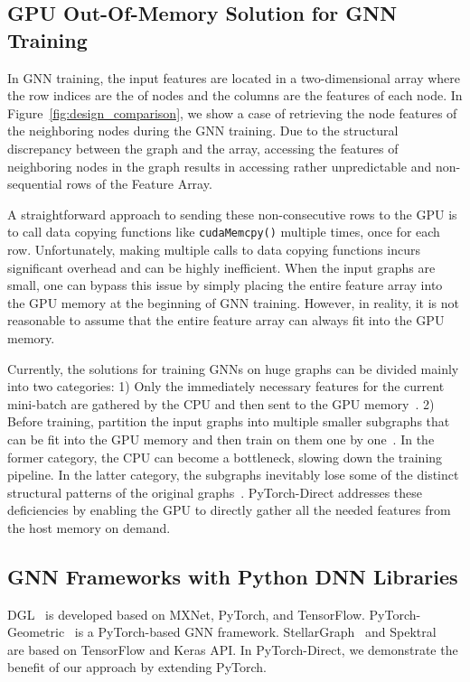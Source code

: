 \subsection{GPU Out-Of-Memory Solution for GNN Training}
In GNN training, the input features are located in a two-dimensional array where the row indices are the  of nodes and the columns are the features of each node.
In Figure~\ref{fig:design_comparison}, we show a case of retrieving the node features of the neighboring nodes during the GNN training.
Due to the structural discrepancy between the graph and the array, accessing the features of neighboring nodes in the graph results in accessing rather unpredictable and non-sequential rows of the Feature Array.


A straightforward approach to sending these non-consecutive rows to the GPU is to call data copying functions like \texttt{cudaMemcpy()} multiple times, once for each row. 
Unfortunately, making multiple calls to data copying functions incurs significant overhead and can be highly inefficient. 
When the input graphs are small, one can bypass this issue by simply placing
the entire feature array into the GPU memory at the beginning of GNN training.
However, in reality, it is not reasonable to assume that the entire feature array can always fit into the GPU memory.

Currently, the solutions for training GNNs on huge graphs can be divided mainly into two categories:
1) Only the immediately necessary features for the current mini-batch are gathered by the CPU and then sent to the GPU memory~\cite{Pinterest}.
2) Before training, partition the input graphs into multiple smaller subgraphs that can be fit into the GPU memory and then train on them one by one~\cite{Chiang2019ClusterGCNAE,graphsaint-iclr20}.
In the former category, the CPU can become a bottleneck, slowing down the training pipeline. In the latter category, the subgraphs inevitably lose some of the distinct structural patterns of the original graphs~\cite{zu2019survey}.
PyTorch-Direct addresses these deficiencies by enabling the GPU to directly gather all the needed features from the host memory on demand.


\subsection{GNN Frameworks with Python DNN Libraries}
DGL~\cite{wang2019deep} is developed based on MXNet, PyTorch, and TensorFlow. 
PyTorch-Geometric~\cite{fey2019fast} is a PyTorch-based GNN framework.
StellarGraph~\cite{StellarGraph} and Spektral~\cite{grattarola2020graph} are based on TensorFlow and Keras API. In PyTorch-Direct, we demonstrate the benefit of our approach by extending PyTorch.


